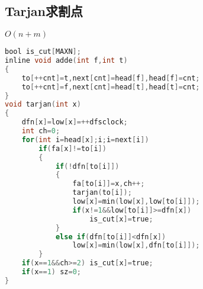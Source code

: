 \subsection{Tarjan求割点}
$O(n+m)$
\begin{lstlisting}[language=C]
bool is_cut[MAXN];
inline void adde(int f,int t)
{
	to[++cnt]=t,next[cnt]=head[f],head[f]=cnt;
	to[++cnt]=f,next[cnt]=head[t],head[t]=cnt;
}
void tarjan(int x)
{
	dfn[x]=low[x]=++dfsclock;
	int ch=0;
	for(int i=head[x];i;i=next[i])
		if(fa[x]!=to[i])
		{
			if(!dfn[to[i]])
			{
				fa[to[i]]=x,ch++;
				tarjan(to[i]);
				low[x]=min(low[x],low[to[i]]);
				if(x!=1&&low[to[i]]>=dfn[x])
					is_cut[x]=true;
			}
			else if(dfn[to[i]]<dfn[x])
				low[x]=min(low[x],dfn[to[i]]);
		}
	if(x==1&&ch>=2) is_cut[x]=true;
	if(x==1) sz=0;
}
\end{lstlisting}